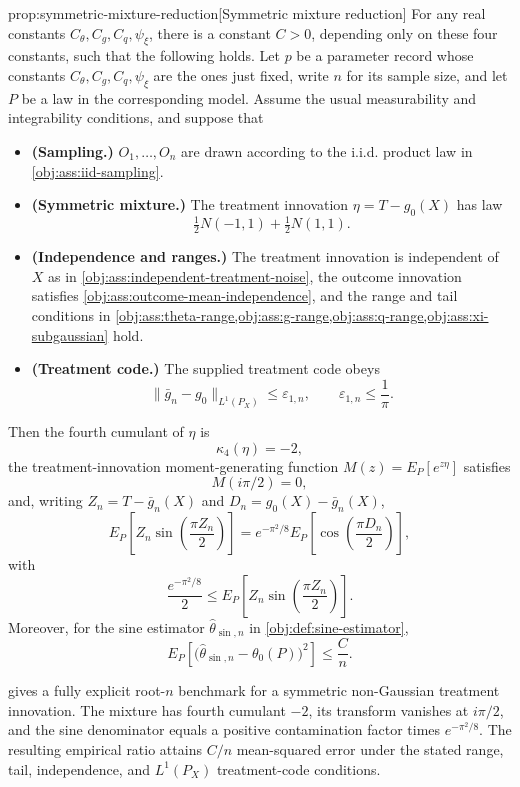 \begin{propositionv}{prop:symmetric-mixture-reduction}[Symmetric mixture reduction]
For any real constants \(C_{\theta},C_g,C_q,\psi_{\xi}\), there is a constant \(C>0\), depending only on these four constants, such that the following holds.  Let \(p\) be a parameter record whose constants \(C_{\theta},C_g,C_q,\psi_{\xi}\) are the ones just fixed, write \(n\) for its sample size, and let \(P\) be a law in the corresponding model.  Assume the usual measurability and integrability conditions, and suppose that
\begin{itemize}
\item \textbf{(Sampling.)} \(O_1,\ldots,O_n\) are drawn according to the i.i.d. product law in \cref{obj:ass:iid-sampling}.
\item \textbf{(Symmetric mixture.)} The treatment innovation \(\eta=T-g_0(X)\) has law
\[
\tfrac12 N(-1,1)+\tfrac12 N(1,1).
\]
\item \textbf{(Independence and ranges.)} The treatment innovation is independent of \(X\) as in \cref{obj:ass:independent-treatment-noise}, the outcome innovation satisfies \cref{obj:ass:outcome-mean-independence}, and the range and tail conditions in \cref{obj:ass:theta-range,obj:ass:g-range,obj:ass:q-range,obj:ass:xi-subgaussian} hold.
\item \textbf{(Treatment code.)} The supplied treatment code obeys
\[
\|\bar g_n-g_0\|_{L^1(P_X)}\le \varepsilon_{1,n},
\qquad
\varepsilon_{1,n}\le \frac1\pi .
\]
\end{itemize}
Then the fourth cumulant of \(\eta\) is
\[
\kappa_4(\eta)=-2,
\]
the treatment-innovation moment-generating function \(M(z)=E_P[e^{z\eta}]\) satisfies
\[
M(i\pi/2)=0,
\]
and, writing \(Z_n=T-\bar g_n(X)\) and \(D_n=g_0(X)-\bar g_n(X)\),
\[
E_P\!\left[
Z_n\sin\!\left(\frac{\pi Z_n}{2}\right)
\right]
=
e^{-\pi^2/8}
E_P\!\left[
\cos\!\left(\frac{\pi D_n}{2}\right)
\right],
\]
with
\[
\frac{e^{-\pi^2/8}}{2}
\le
E_P\!\left[
Z_n\sin\!\left(\frac{\pi Z_n}{2}\right)
\right].
\]
Moreover, for the sine estimator \(\widehat\theta_{\sin,n}\) in \cref{obj:def:sine-estimator},
\[
E_P\!\left[
\bigl(\widehat\theta_{\sin,n}-\theta_0(P)\bigr)^2
\right]
\le
\frac{C}{n}.
\]
\end{propositionv}

 gives a fully explicit root-\(n\) benchmark for a symmetric non-Gaussian treatment innovation. The mixture has fourth cumulant \(-2\), its transform vanishes at \(i\pi/2\), and the sine denominator equals a positive contamination factor times \(e^{-\pi^2/8}\). The resulting empirical ratio attains \(C/n\) mean-squared error under the stated range, tail, independence, and \(L^1(P_X)\) treatment-code conditions.

